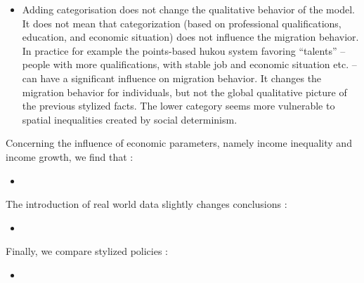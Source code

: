 \begin{itemize}
\item Adding categorisation does not change the qualitative behavior of the model. It does not mean that categorization (based on professional qualifications, education, and economic situation) does not influence the migration behavior. In practice for example the points-based hukou system favoring “talents” – people with more qualifications, with stable job and economic situation etc. – can have a significant influence on migration behavior. It changes the migration behavior for individuals, but not the global qualitative picture of the previous stylized facts. %
The lower category seems more vulnerable to spatial inequalities created by social determinism.
\end{itemize}

Concerning the influence of economic parameters, namely income inequality and income growth, we find that :

\begin{itemize}
\item 
\end{itemize}

The introduction of real world data slightly changes conclusions :

\begin{itemize}
\item 
\end{itemize}

Finally, we compare stylized policies :

\begin{itemize}
\item 
\end{itemize}











